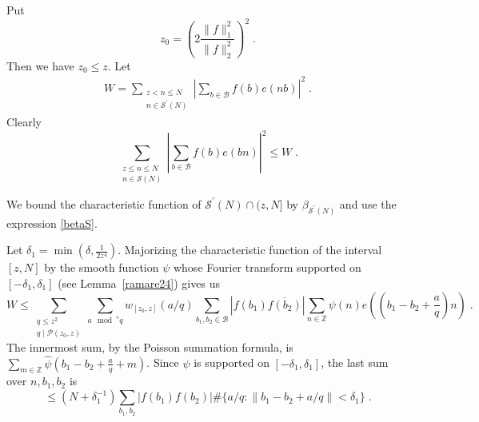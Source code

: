 \documentclass[12pt,article]{amsart}
\theoremstyle{remark}
\numberwithin{equation}{section}
\begin{document}
	
	\vspace{2mm}
	\noindent
	Put 
	\begin{equation}
		\label{z0}
		z_0=\left(2\frac{\|f\|_1^2}{\|f\|_2^2}\right)^2\; .
	\end{equation}
	Then we have $z_0\leq z$. Let 
	\begin{align}\label{W def}
		W=\sum_{\substack{z<n\leq N\\ n\in \mathcal{S}^{\prime}(N)}}\left|\sum_{b\in\mathcal{B}}f(b)e(nb)\right|^2\;.
	\end{align}
	Clearly 
	\[ 
	\sum_{\substack{z\leq n\leq N\\ n\in \mathcal{S}(N)}}\left|\sum_{b\in \mathcal{B}}f(b)e(bn)\right|^2 \leq W\; .
	\]
	
	\noindent	 We bound the characteristic function of $\mathcal{S}^{\prime}(N)\cap(z,N]$ by $\beta_{\mathcal{S}^{\prime}(N)}$ and use the expression \eqref{betaS}. 
	
	\vspace{2mm}
	\noindent
	Let $\delta_1=\min(\delta,\frac{1}{2z^4})$. Majorizing  the characteristic function of the interval $[z, N]$ by the smooth function  $\psi$ whose Fourier transform supported on $[-\delta_1,
	\delta_1]$ (see Lemma~\ref{ramare24}) gives us
	\[
	W\leq\sum_{\substack{q\leq z^2\\ q\mid \mathcal{P}(z_0,z)}}\sum_{a\mod^* q}w_{[z_0,z]}(a/q) \sum_{b_1,b_2\in \mathcal{B}}|f(b_1)\overline{f(b_2)}|\sum_{n\in \mathbb{Z}} \psi(n) e\left(\left(b_1-b_2+\frac{a}{q}\right)n\right)\; .
	\]
	\noindent
	The innermost sum, by the Poisson summation formula, is $\sum_{m\in \mathbb{Z}}\widehat{\psi}\left(b_1-b_2+\frac{a}{q}+m\right)$. Since $\widehat{\psi}$ is supported on $[-\delta_1, \delta_1]$, the last sum over $n, b_1, b_2$ is 
	\[
	\leq (N+\delta_1^{-1}) \sum_{b_1,b_2} |f(b_1)f(b_2)|\# \{a/q:\|b_1-b_2+a/q\|<\delta_1\}\;.
	\]
	
\end{document}
